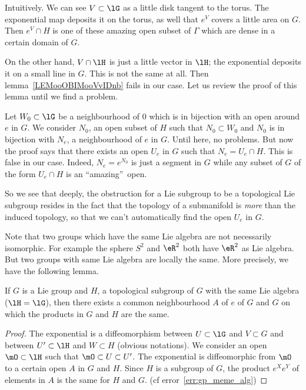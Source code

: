 Intuitively. We can see $V\subset\lG$ as a little disk tangent to  the torus. The exponential map deposits it on the torus, as well that $e^V$ covers a little area on $G$. Then $e^V\cap H$ is one of these amazing open subset of $\Gamma$ which are dense in a certain domain of $G$.

On the other hand, $V\cap\lH$ is just a little vector in $\lH$; the exponential deposits it on a small line in $G$. This is not the same at all. Then lemma~\ref{LEMooOBIMooVvIDnb} fails in our case. Let us review the proof of this lemma until we find a problem.

Let $W_0\subset\lG$  be a neighbourhood of $0$ which is in bijection with an open around $e$ in $G$. We consider $N_0$, an open subset of $H$ such that $N_0\subset W_0$ and $N_0$ is in bijection with $N_e$, a neighbourhood of $e$ in $G$. Until here, no problems. But now the proof says that there exists an open $U_e$ in $G$ such that $N_e=U_e\cap H$. This is false in our case. Indeed, $N_e=e^{N_0}$ is just a segment in $G$ while any subset of $G$ of the form $U_e\cap H$ is an ``amazing''\ open.

So we see that deeply, the obstruction for a Lie subgroup to be a topological Lie subgroup resides in the fact that the topology of a submanifold is \emph{more} than the induced topology, so that we can't automatically find the open $U_e$ in $G$.


Note that two groups which have the same Lie algebra are not necessarily isomorphic. For example the sphere $S^2$ and $\eR^2$ both have $\eR^2$ as Lie algebra. But two groups with same Lie algebra are locally the same. More precisely, we have the following lemma.

\begin{lemma}
If $G$ is a Lie group and $H$, a topological subgroup of $G$ with the same Lie algebra ($\lH=\lG$), then there exists a common neighbourhood $A$ of $e$ of $G$ and $G$ on which the products in $G$ and $H$ are the same.
\end{lemma}

\begin{proof}
The exponential is a diffeomorphism between $U\subset\lG$ and $V\subset G$ and between $U'\subset\lH$ and $W\subset H$ (obvious notations). We consider an open $\mO\subset\lH$ such that $\mO\subset U\subset U'$. The exponential is diffeomorphic from $\mO$ to a certain open $A$ in $G$ and $H$. Since $H$ is a subgroup of $G$, the product $e^Xe^Y$ of elements in $A$ is the same for $H$ and $G$. (cf error~\ref{err:gp_meme_alg})
\end{proof}

